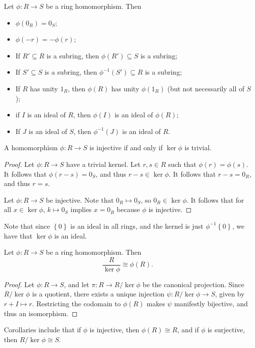 \begin{proposition}\label{prp:2.3}
	Let $\phi : R \to S$ be a ring homomorphism. Then
	\begin{itemize}
		\item $\phi (0_R)=0_S$;
		\item $\phi (-r)=-\phi (r)$;
		\item If $R'\subseteq R$ is a subring, then $\phi (R')\subseteq S$ is a subring;
		\item If $S'\subseteq S$ is a subring, then $\phi ^{-1} (S')\subseteq R$ is a subring;
		\item If $R$ has unity $1_R$, then $\phi (R)$ has unity $\phi (1_R)$ (but not necessarily all of $S$);
		\item if $I$ is an ideal of $R$, then $\phi (I)$ is an ideal of $\phi (R)$;
		\item If $J$ is an ideal of $S$, then $\phi ^{-1} \left( J \right) $ is an ideal of $R$.
	\end{itemize}
\end{proposition}
\begin{proposition}\label{prp:2.4}
	A homomorphism $\phi : R \to S$ is injective if and only if $\ker \phi $ is trivial.
\end{proposition}
\begin{proof}
	Let $\phi : R \to S$ have a trivial kernel. Let $r,s\in R$ such that $\phi (r)=\phi (s)$. It follows that $\phi (r-s)=0_S$, and thus $r-s\in \ker \phi $. It follows that $r-s=0_R$, and thus $r=s$.

	Let $\phi : R \to S$ be injective. Note that $0_R\mapsto 0_S$, so $0_R\in \ker \phi $. It follows that for all $x\in \ker \phi $, $k\mapsto 0_S$ implies $x=0_R$ because $\phi $ is injective.
\end{proof}
Note that since $\left\{ 0 \right\} $ is an ideal in all rings, and the kernel is just $\phi ^{-1} \left\{ 0 \right\} $, we have that $\ker \phi $ is an ideal.
\begin{theorem}\label{thm:2.1}
	Let $\phi : R \to S$ be a ring homomorphism. Then
	\[
		\frac{R}{\ker \phi } \cong \phi (R)
	.\]
\end{theorem}
\begin{proof}
	Let $\phi : R \to S$, and let $\pi : R \to R/\ker \phi $ be the canonical projection. Since $R/\ker \phi $ is a quotient, there exists a unique injection $\psi : R/\ker \phi  \to S$, given by $r+I\mapsto r$. Restricting the codomain to $\phi (R)$ makes $\psi $ manifestly bijective, and thus an isomorphism.
\end{proof}

Corollaries include that if $\phi $ is injective, then $\phi (R)\cong R$, and if $\phi $ is  surjective, then $R/\ker \phi \cong S$.
